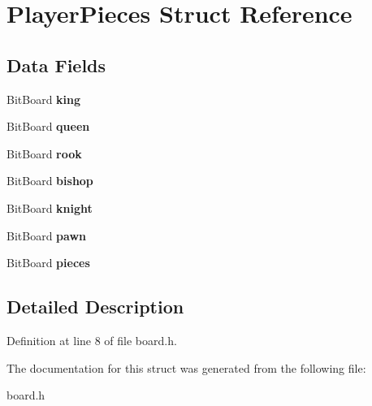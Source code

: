 \hypertarget{struct_player_pieces}{\section{Player\-Pieces Struct Reference}
\label{struct_player_pieces}
}
\subsection*{Data Fields}
\begin{DoxyCompactItemize}
\item 
\hypertarget{struct_player_pieces_ae5369e7cd2d1526b621082fb1ef76bb5}{Bit\-Board {\bfseries king}}\label{struct_player_pieces_ae5369e7cd2d1526b621082fb1ef76bb5}

\item 
\hypertarget{struct_player_pieces_afd98bfe398caf17c232dc9136134ad9d}{Bit\-Board {\bfseries queen}}\label{struct_player_pieces_afd98bfe398caf17c232dc9136134ad9d}

\item 
\hypertarget{struct_player_pieces_a5b155965d4bdac188932e86028b7ef7e}{Bit\-Board {\bfseries rook}}\label{struct_player_pieces_a5b155965d4bdac188932e86028b7ef7e}

\item 
\hypertarget{struct_player_pieces_acf4ce2af96da8afbf11dcda3ff9832a3}{Bit\-Board {\bfseries bishop}}\label{struct_player_pieces_acf4ce2af96da8afbf11dcda3ff9832a3}

\item 
\hypertarget{struct_player_pieces_a0d50904b0193e5be1eee49dfa4b99ff1}{Bit\-Board {\bfseries knight}}\label{struct_player_pieces_a0d50904b0193e5be1eee49dfa4b99ff1}

\item 
\hypertarget{struct_player_pieces_aa78c32a1efa42bbf0e992864644e6e23}{Bit\-Board {\bfseries pawn}}\label{struct_player_pieces_aa78c32a1efa42bbf0e992864644e6e23}

\item 
\hypertarget{struct_player_pieces_a1b3bd73b55c20e24e8ee0d051515a073}{Bit\-Board {\bfseries pieces}}\label{struct_player_pieces_a1b3bd73b55c20e24e8ee0d051515a073}

\end{DoxyCompactItemize}


\subsection{Detailed Description}


Definition at line 8 of file board.\-h.



The documentation for this struct was generated from the following file\-:\begin{DoxyCompactItemize}
\item 
board.\-h\end{DoxyCompactItemize}
